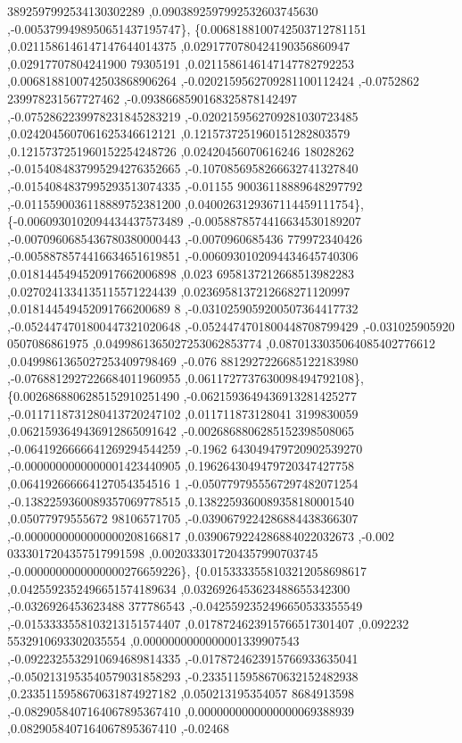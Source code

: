 \begin{DoxyCode}
      3892597992534130302289 ,0.0903892597992532603745630 ,-0.0053799498950651437195747\},
\{0.0068188100742503712781151 ,0.0211586146147147644014375 ,0.0291770780424190356860947 ,0.02917707804241900
      79305191 ,0.0211586146147147782792253 ,0.0068188100742503868906264 ,-0.0202159562709281100112424 ,-0.0752862
      239978231567727462 ,-0.0938668590168325878142497 ,-0.0752862239978231845283219 ,-0.0202159562709281030723485
       ,0.0242045607061625346612121 ,0.1215737251960151282803579 ,0.1215737251960152254248726 ,0.02420456070616246
      18028262 ,-0.0154084837995294276352665 ,-0.1070856958266632741327840 ,-0.0154084837995293513074335 ,-0.01155
      90036118889648297792 ,-0.0115590036118889752381200 ,0.0400263129367114459111754\},
\{-0.0060930102094434437573489 ,-0.0058878574416634530189207 ,-0.0070960685436780380000443 ,-0.0070960685436
      779972340426 ,-0.0058878574416634651619851 ,-0.0060930102094434645740306 ,0.0181445494520917662006898 ,0.023
      6958137212668513982283 ,0.0270241334135115571224439 ,0.0236958137212668271120997 ,0.018144549452091766200689
      8 ,-0.0310259059200507364417732 ,-0.0524474701800447321020648 ,-0.0524474701800448708799429 ,-0.031025905920
      0507086861975 ,0.0499861365027253062853774 ,0.0870133035064085402776612 ,0.0499861365027253409798469 ,-0.076
      8812927226685122183980 ,-0.0768812927226684011960955 ,0.0611727737630098494792108\},
\{0.0026868806285152910251490 ,-0.0621593649436913281425277 ,-0.0117118731280413720247102 ,0.011711873128041
      3199830059 ,0.0621593649436912865091642 ,-0.0026868806285152398508065 ,-0.0641926666641269294544259 ,-0.1962
      643049479720902539270 ,-0.0000000000000001423440905 ,0.1962643049479720347427758 ,0.064192666664127054354516
      1 ,-0.0507797955567297482071254 ,-0.1382259360089357069778515 ,0.1382259360089358180001540 ,0.05077979555672
      98106571705 ,-0.0390679224286884438366307 ,-0.0000000000000000208166817 ,0.0390679224286884022032673 ,-0.002
      0333017204357517991598 ,0.0020333017204357990703745 ,-0.0000000000000000276659226\},
\{0.0153333558103212058698617 ,0.0425592352496651574189634 ,0.0326926453623488655342300 ,-0.0326926453623488
      377786543 ,-0.0425592352496650533355549 ,-0.0153333558103213151574407 ,0.0178724623915766517301407 ,0.092232
      5532910693302035554 ,0.0000000000000001339907543 ,-0.0922325532910694689814335 ,-0.0178724623915766933635041
       ,-0.0502131953540579031858293 ,-0.2335115958670632152482938 ,0.2335115958670631874927182 ,0.050213195354057
      8684913598 ,-0.0829058407164067895367410 ,0.0000000000000000069388939 ,0.0829058407164067895367410 ,-0.02468

\end{DoxyCode}
